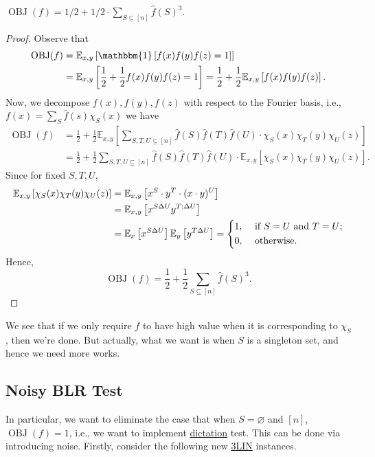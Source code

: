 \begin{theorem}[\cite{10.1145/100216.100225}]\label{thm:BLR}
	\(\mathop{\mathrm{OBJ}}(f) = 1 / 2 + 1 / 2 \cdot \sum_{S \subseteq [n]} \hat{f} (S)^3 \).
\end{theorem}
\begin{proof}
	Observe that
	\[
		\begin{split}
			\mathop{\mathrm{OBJ}}(f)
			&= \mathbb{E}_{x, y}\left[\mathbbm{1}\left[ f(x)f(y)f(z) = 1 \right] \right]\\
			&= \mathbb{E}_{x, y}\left[\frac{1}{2} + \frac{1}{2} f(x)f(y)f(z) = 1 \right]
			= \frac{1}{2} + \frac{1}{2} \mathbb{E}_{x, y}\left[f(x)f(y)f(z) \right].
		\end{split}
	\]
	Now, we decompose \(f(x), f(y), f(z)\) with respect to the Fourier basis, i.e., \(f(x) = \sum_{S} \hat{f} (s)\chi _S(x)\) we have
	\[
		\begin{split}
			\mathop{\mathrm{OBJ}}(f)
			&= \frac{1}{2} + \frac{1}{2} \mathbb{E}_{x, y}\left[\sum_{S, T, U \subseteq [n]} \hat{f} (S)\hat{f} (T)\hat{f} (U) \cdot \chi _S(x) \chi _T(y) \chi _U(z)\right]\\
			&= \frac{1}{2} + \frac{1}{2} \sum_{S, T, U \subseteq [n]} \hat{f} (S)\hat{f} (T)\hat{f} (U) \cdot \mathbb{E}_{x, y}\left[\chi _S(x) \chi _T(y) \chi _U(z)\right].
		\end{split}
	\]
	Since for fixed \(S, T, U\),
	\[
		\begin{split}
			\mathbb{E}_{x, y}\left[\chi _S(x) \chi _T(y) \chi _U(z)\right]
			&= \mathbb{E}_{x, y}\left[x^S\cdot y^T\cdot (x\cdot y)^U \right]\\
			&= \mathbb{E}_{x, y}\left[x^{S \Delta U} y^{T;\Delta U} \right]\\
			&= \mathbb{E}_{x}\left[x^{S \Delta U} \right] \mathbb{E}_{y}\left[y^{T \Delta U} \right]
			= \begin{dcases}
				1, & \text{ if } S=U \text{ and } T=U ; \\
				0, & \text{ otherwise} .
			\end{dcases}
		\end{split}
	\]
	Hence,
	\[
		\mathop{\mathrm{OBJ}}(f)
		= \frac{1}{2} + \frac{1}{2} \sum_{S \subseteq [n]} \hat{f} (S)^3 .
	\]
\end{proof}

We see that if we only require \(f\) to have high value when it is corresponding to \(\chi _S\), then we're done. But actually, what we want is when \(S\) is a singleton set, and hence we need more works.

\subsection{Noisy BLR Test}
In particular, we want to eliminate the case that when \(S = \varnothing \) and \([n]\), \(\mathop{\mathrm{OBJ}}(f) = 1\), i.e., we want to implement \hyperref[not:dictation]{dictation} test. This can be done via introducing noise. Firstly, consider the following new \hyperref[prb:max-3LIN]{3LIN} instances.

